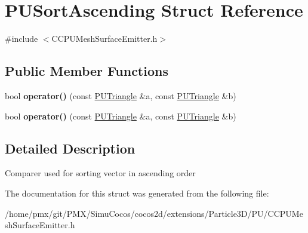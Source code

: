 \hypertarget{structPUSortAscending}{}\section{P\+U\+Sort\+Ascending Struct Reference}
\label{structPUSortAscending}


{\ttfamily \#include $<$C\+C\+P\+U\+Mesh\+Surface\+Emitter.\+h$>$}

\subsection*{Public Member Functions}
\begin{DoxyCompactItemize}
\item 
\mbox{\label{structPUSortAscending_af1a20923b920fb81e45fb2541ef7e553}} 
bool {\bfseries operator()} (const \hyperlink{classPUTriangle}{P\+U\+Triangle} \&a, const \hyperlink{classPUTriangle}{P\+U\+Triangle} \&b)
\item 
\mbox{\label{structPUSortAscending_af1a20923b920fb81e45fb2541ef7e553}} 
bool {\bfseries operator()} (const \hyperlink{classPUTriangle}{P\+U\+Triangle} \&a, const \hyperlink{classPUTriangle}{P\+U\+Triangle} \&b)
\end{DoxyCompactItemize}


\subsection{Detailed Description}
Comparer used for sorting vector in ascending order 

The documentation for this struct was generated from the following file\+:\begin{DoxyCompactItemize}
\item 
/home/pmx/git/\+P\+M\+X/\+Simu\+Cocos/cocos2d/extensions/\+Particle3\+D/\+P\+U/C\+C\+P\+U\+Mesh\+Surface\+Emitter.\+h\end{DoxyCompactItemize}
